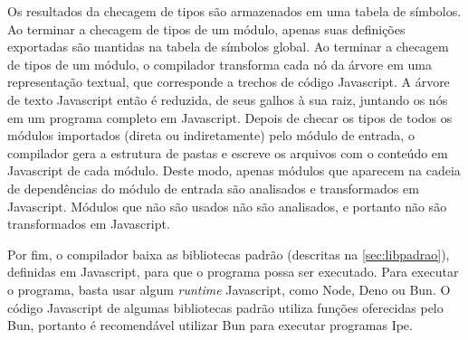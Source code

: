 Os resultados da checagem de tipos são armazenados em uma tabela de símbolos. Ao terminar a checagem
de tipos de um módulo, apenas suas definições exportadas são mantidas na tabela de símbolos global.
Ao terminar a checagem de tipos de um módulo, o compilador transforma cada nó da árvore em uma
representação textual, que corresponde a trechos de código Javascript. A árvore de texto Javascript
então é reduzida, de seus galhos à sua raiz, juntando os nós em um programa completo em Javascript.
Depois de checar os tipos de todos os módulos importados (direta ou indiretamente) pelo módulo de
entrada, o compilador gera a estrutura de pastas e escreve os arquivos com o conteúdo em Javascript
de cada módulo. Deste modo, apenas módulos que aparecem na cadeia de dependências do módulo de entrada
são analisados e transformados em Javascript. Módulos que não são usados não são analisados, e
portanto não são transformados em Javascript.

Por fim, o compilador baixa as bibliotecas padrão (descritas na \autoref{sec:libpadrao}), definidas
em Javascript, para que o programa possa ser executado. Para executar o programa, basta usar algum
\textit{runtime} Javascript, como Node, Deno ou Bun. O código Javascript de algumas bibliotecas
padrão utiliza funções oferecidas pelo Bun, portanto é recomendável utilizar Bun para executar
programas Ipe.
